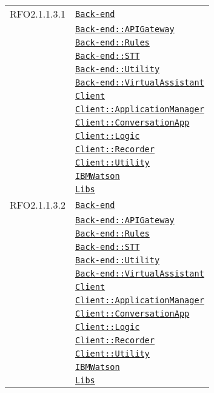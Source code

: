 \begin{longtable}{|>{\centering}m{3cm}|m{10cm}<{\centering}|}
RFO2.1.1.3.1 & \hyperref[Back-end]{\texttt{Back-end}}\\
& \hyperref[Back-end::APIGateway]{\texttt{Back-end::APIGateway}}\\
& \hyperref[Back-end::Rules]{\texttt{Back-end::Rules}}\\
& \hyperref[Back-end::STT]{\texttt{Back-end::STT}}\\
& \hyperref[Back-end::Utility]{\texttt{Back-end::Utility}}\\
& \hyperref[Back-end::VirtualAssistant]{\texttt{Back-end::VirtualAssistant}}\\
& \hyperref[Client]{\texttt{Client}}\\
& \hyperref[Client::ApplicationManager]{\texttt{Client::ApplicationManager}}\\
& \hyperref[Client::ConversationApp]{\texttt{Client::ConversationApp}}\\
& \hyperref[Client::Logic]{\texttt{Client::Logic}}\\
& \hyperref[Client::Recorder]{\texttt{Client::Recorder}}\\
& \hyperref[Client::Utility]{\texttt{Client::Utility}}\\
& \hyperref[IBMWatson]{\texttt{IBMWatson}}\\
& \hyperref[Libs]{\texttt{Libs}}\\ \hline

RFO2.1.1.3.2 & \hyperref[Back-end]{\texttt{Back-end}}\\
& \hyperref[Back-end::APIGateway]{\texttt{Back-end::APIGateway}}\\
& \hyperref[Back-end::Rules]{\texttt{Back-end::Rules}}\\
& \hyperref[Back-end::STT]{\texttt{Back-end::STT}}\\
& \hyperref[Back-end::Utility]{\texttt{Back-end::Utility}}\\
& \hyperref[Back-end::VirtualAssistant]{\texttt{Back-end::VirtualAssistant}}\\
& \hyperref[Client]{\texttt{Client}}\\
& \hyperref[Client::ApplicationManager]{\texttt{Client::ApplicationManager}}\\
& \hyperref[Client::ConversationApp]{\texttt{Client::ConversationApp}}\\
& \hyperref[Client::Logic]{\texttt{Client::Logic}}\\
& \hyperref[Client::Recorder]{\texttt{Client::Recorder}}\\
& \hyperref[Client::Utility]{\texttt{Client::Utility}}\\
& \hyperref[IBMWatson]{\texttt{IBMWatson}}\\
& \hyperref[Libs]{\texttt{Libs}}\\ \hline


\end{longtable}
